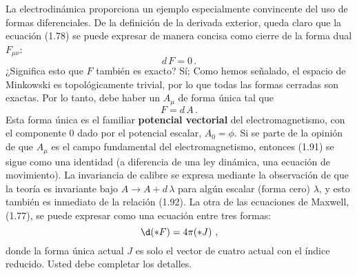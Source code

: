 \documentclass[11pt,b5paper,openany,twoside]{book}
\begin{document}
La electrodinámica proporciona un ejemplo especialmente convincente del uso de formas diferenciales.
De la definición de la derivada exterior, queda claro que la ecuación (1.78) se puede expresar de manera concisa como cierre de la forma dual $F_{\mu\nu}$:
\begin{equation}
 d\,F = 0\,.\label{1.91}
\end{equation}
¿Significa esto que $F$ también es exacto? Sí; Como hemos señalado, el espacio de Minkowski es topológicamente trivial, por lo que todas las formas cerradas son exactas.
Por lo tanto, debe haber un $A_\mu$ de forma única tal que
\begin{equation}
F =  d\,A\,.\label{1.92}
\end{equation}
Esta forma única es el familiar {\bf potencial vectorial} del electromagnetismo, con el componente $0$ dado por el potencial escalar, $A_0 = \phi$.
Si se parte de la opinión de que $A_\mu$ es el campo fundamental del electromagnetismo, entonces (1.91) se sigue como una identidad (a diferencia de una ley dinámica, una ecuación de movimiento).
La invariancia de calibre se expresa mediante la observación de que la teoría es invariante bajo $A \rightarrow A + d\,\lambda$ para algún escalar (forma cero) $\lambda$, y esto también es inmediato de la relación (1.92).
La otra de las ecuaciones de Maxwell, (1.77), se puede expresar como una ecuación entre tres formas:
\begin{equation}
\d(*F) = 4\pi(* J)\ ,\label{1.93}
\end{equation}
donde la forma única actual $J$ es solo el vector de cuatro actual con el índice reducido.
Usted debe completar los detalles.
\end{document}
